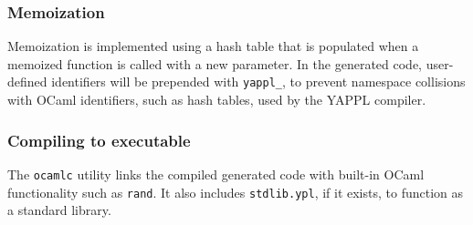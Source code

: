 \subsubsection{Memoization}
Memoization is implemented using a hash table that is populated when a memoized function is called with a new parameter.  In the generated code, user-defined identifiers will be prepended with \texttt{yappl\_}, to prevent namespace collisions with OCaml identifiers, such as hash tables, used by the YAPPL compiler.
\subsubsection{Compiling to executable}
The \texttt{ocamlc} utility links the compiled generated code with built-in OCaml functionality such as \texttt{rand}. It also includes \texttt{stdlib.ypl}, if it exists, to function as a standard library.